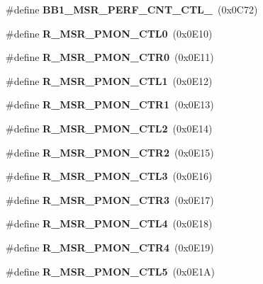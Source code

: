 \begin{DoxyCompactItemize}
\item 
\#define {\bfseries B\+B1\+\_\+\+M\+S\+R\+\_\+\+P\+E\+R\+F\+\_\+\+C\+N\+T\+\_\+\+C\+T\+L\+\_}~(0x0\+C72)\label{types_8h_acd0d76fc99515638469c45af914911fd}

\item 
\#define {\bfseries R\+\_\+\+M\+S\+R\+\_\+\+P\+M\+O\+N\+\_\+\+C\+T\+L0}~(0x0\+E10)\label{types_8h_af59d8541df8e5d53dc246d82d2a1d308}

\item 
\#define {\bfseries R\+\_\+\+M\+S\+R\+\_\+\+P\+M\+O\+N\+\_\+\+C\+T\+R0}~(0x0\+E11)\label{types_8h_aca5c935e94f63573a1952360d27cd292}

\item 
\#define {\bfseries R\+\_\+\+M\+S\+R\+\_\+\+P\+M\+O\+N\+\_\+\+C\+T\+L1}~(0x0\+E12)\label{types_8h_adc34ee61f18fe9ea31afab3bc2a051ff}

\item 
\#define {\bfseries R\+\_\+\+M\+S\+R\+\_\+\+P\+M\+O\+N\+\_\+\+C\+T\+R1}~(0x0\+E13)\label{types_8h_a582c8c015836e8dc390d7f2aca275275}

\item 
\#define {\bfseries R\+\_\+\+M\+S\+R\+\_\+\+P\+M\+O\+N\+\_\+\+C\+T\+L2}~(0x0\+E14)\label{types_8h_acf75418036ae39a09749cf220e8852ac}

\item 
\#define {\bfseries R\+\_\+\+M\+S\+R\+\_\+\+P\+M\+O\+N\+\_\+\+C\+T\+R2}~(0x0\+E15)\label{types_8h_a2565d3aa63c53f8c762a8bbca6ae5557}

\item 
\#define {\bfseries R\+\_\+\+M\+S\+R\+\_\+\+P\+M\+O\+N\+\_\+\+C\+T\+L3}~(0x0\+E16)\label{types_8h_a03516d9b5b9b1a01487b66183cd05e4f}

\item 
\#define {\bfseries R\+\_\+\+M\+S\+R\+\_\+\+P\+M\+O\+N\+\_\+\+C\+T\+R3}~(0x0\+E17)\label{types_8h_ad0eae26f39eb1bce7640d6fcbeffdd78}

\item 
\#define {\bfseries R\+\_\+\+M\+S\+R\+\_\+\+P\+M\+O\+N\+\_\+\+C\+T\+L4}~(0x0\+E18)\label{types_8h_ad12afe1f2cbdde949fc5e627458eb8ad}

\item 
\#define {\bfseries R\+\_\+\+M\+S\+R\+\_\+\+P\+M\+O\+N\+\_\+\+C\+T\+R4}~(0x0\+E19)\label{types_8h_ab3524046d5822fed0e47828d20acc3e9}

\item 
\#define {\bfseries R\+\_\+\+M\+S\+R\+\_\+\+P\+M\+O\+N\+\_\+\+C\+T\+L5}~(0x0\+E1\+A)\label{types_8h_a394018738b4fdd7e6a794db59bd74fab}


\end{DoxyCompactItemize}
